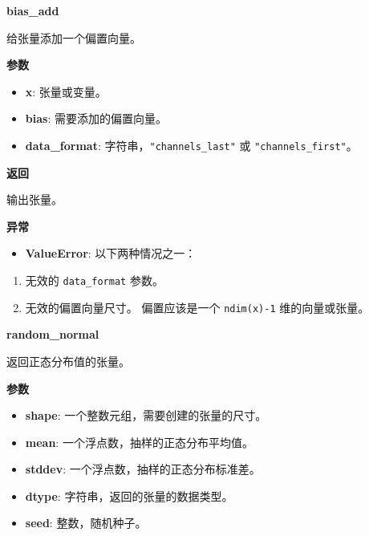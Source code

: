 \textbf{bias\_add}\label{biasux5fadd}

\begin{Shaded}
\begin{Highlighting}[]
\OperatorTok{=}\NormalTok{)}
\end{Highlighting}
\end{Shaded}

给张量添加一个偏置向量。

\textbf{参数}

\begin{itemize}
\tightlist
\item
  \textbf{x}: 张量或变量。
\item
  \textbf{bias}: 需要添加的偏置向量。
\item
  \textbf{data\_format}: 字符串，\texttt{"channels\_last"} 或
  \texttt{"channels\_first"}。
\end{itemize}

\textbf{返回}

输出张量。

\textbf{异常}

\begin{itemize}
\tightlist
\item
  \textbf{ValueError}: 以下两种情况之一：
\end{itemize}

\begin{enumerate}
\def\labelenumi{\arabic{enumi}.}
\tightlist
\item
  无效的 \texttt{data\_format} 参数。
\item
  无效的偏置向量尺寸。 偏置应该是一个 \texttt{ndim(x)-1}
  维的向量或张量。
\end{enumerate}


\textbf{random\_normal}\label{randomux5fnormal}

\begin{Shaded}
\begin{Highlighting}[]
\OperatorTok{=}\OperatorTok{=}\OperatorTok{=}\OperatorTok{=}\NormalTok{)}
\end{Highlighting}
\end{Shaded}

返回正态分布值的张量。

\textbf{参数}

\begin{itemize}
\tightlist
\item
  \textbf{shape}: 一个整数元组，需要创建的张量的尺寸。
\item
  \textbf{mean}: 一个浮点数，抽样的正态分布平均值。
\item
  \textbf{stddev}: 一个浮点数，抽样的正态分布标准差。
\item
  \textbf{dtype}: 字符串，返回的张量的数据类型。
\item
  \textbf{seed}: 整数，随机种子。
\end{itemize}

